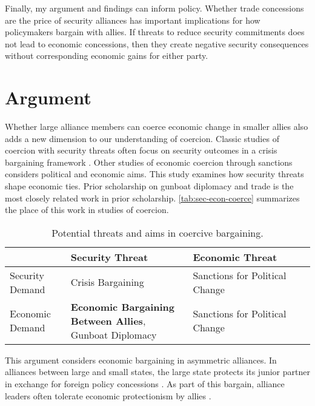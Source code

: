 \documentclass[12pt]{article}
\begin{document}
Finally, my argument and findings can inform policy. 
Whether trade concessions are the price of security alliances has important implications for how policymakers bargain with allies. 
If threats to reduce security commitments does not lead to economic concessions, then they create negative security consequences without corresponding economic gains for either party. 


\section{Argument}


Whether large alliance members can coerce economic change in smaller allies also adds a new dimension to our understanding of coercion. 
Classic studies of coercion with security threats often focus on security outcomes in a crisis bargaining framework \citep{Sechser2011, Cebuletal2021}. 
Other studies of economic coercion through sanctions considers political \citep{Marinov2005, Bapatetal2016} and economic aims. 
This study examines how security threats shape economic ties. 
Prior scholarship on gunboat diplomacy and trade is the most closely related work in prior scholarship. 
\autoref{tab:sec-econ-coerce} summarizes the place of this work in studies of coercion.



\begin{table}[hbt!]
\begin{center}
\begin{tabular}{| p{0.2\linewidth} | p{0.4\linewidth} | p{0.4\linewidth} | }
\hline
              &   Security Threat & Economic Threat \\
\hline                  
Security Demand  & Crisis Bargaining &  Sanctions for Political Change \\
Economic Demand  & \textbf{Economic Bargaining Between Allies}, Gunboat Diplomacy  &  Sanctions for Political Change  \\     
\hline                          
\end{tabular}
\caption{Potential threats and aims in coercive bargaining.}
\label{tab:sec-econ-coerce}
\end{center} 
\end{table}


This argument considers economic bargaining in asymmetric alliances. 
In alliances between large and small states, the large state protects its junior partner in exchange for foreign policy concessions \citep{Morrow1991}.
As part of this bargain, alliance leaders often tolerate economic protectionism by allies \citep{Mastanduno1998, WolfordKim2017}. 
\end{document}
